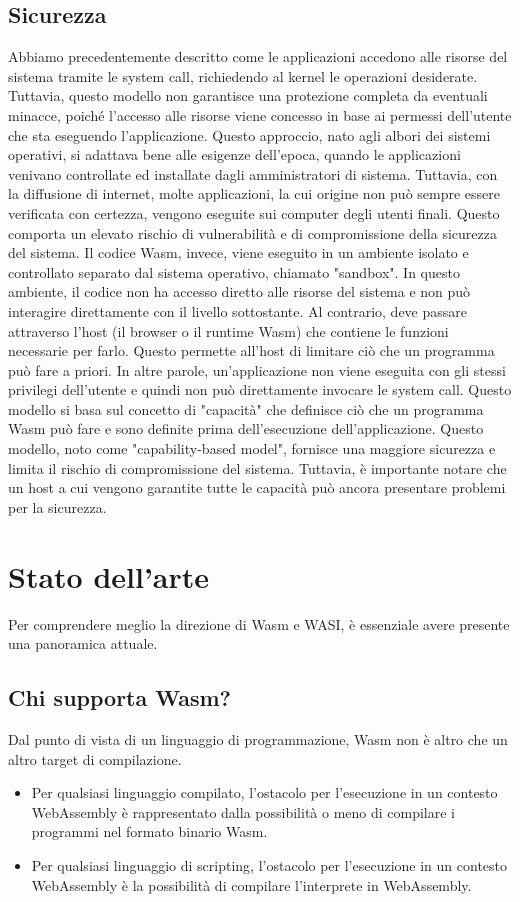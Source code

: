\subsection{Sicurezza}
Abbiamo precedentemente descritto come le applicazioni accedono alle risorse del sistema tramite le system call,
richiedendo al kernel le operazioni desiderate. Tuttavia, questo modello non garantisce una protezione completa da
eventuali minacce, poiché l'accesso alle risorse viene concesso in base ai permessi dell'utente che sta eseguendo
l'applicazione. Questo approccio, nato agli albori dei sistemi operativi, si adattava bene alle esigenze dell'epoca,
quando le applicazioni venivano controllate ed installate dagli amministratori di sistema. Tuttavia, con la diffusione
di internet, molte applicazioni, la cui origine non può sempre essere verificata con certezza, vengono eseguite sui
computer degli utenti finali. Questo comporta un elevato rischio di vulnerabilità e di compromissione della sicurezza
del sistema. Il codice Wasm, invece, viene eseguito in un ambiente isolato e controllato separato dal sistema operativo,
chiamato "sandbox". In questo ambiente, il codice non ha accesso diretto alle risorse del sistema e non può interagire
direttamente con il livello sottostante. Al contrario, deve passare attraverso l'host (il browser o il runtime Wasm) che
contiene le funzioni necessarie per farlo. Questo permette all'host di limitare ciò che un programma può fare a priori.
In altre parole, un'applicazione non viene eseguita con gli stessi privilegi dell’utente e quindi non può direttamente
invocare le system call. Questo modello si basa sul concetto di "capacità" che definisce ciò che un programma Wasm può
fare e sono definite prima dell'esecuzione dell'applicazione. Questo modello, noto come "capability-based model",
fornisce una maggiore sicurezza e limita il rischio di compromissione del sistema. Tuttavia, è importante notare che un
host a cui vengono garantite tutte le capacità può ancora presentare problemi per la sicurezza.

\section{Stato dell'arte}
Per comprendere meglio la direzione di Wasm e WASI, è essenziale avere presente una panoramica attuale.

\subsection{Chi supporta Wasm?}
Dal punto di vista di un linguaggio di programmazione, Wasm non è altro che un altro target di compilazione.
\begin{itemize}
    \item Per qualsiasi linguaggio compilato, l'ostacolo per l'esecuzione in un contesto WebAssembly è rappresentato
    dalla possibilità o meno di compilare i programmi nel formato binario Wasm.
    \item Per qualsiasi linguaggio di scripting, l'ostacolo per l'esecuzione in un contesto WebAssembly è la possibilità
    di compilare l'interprete in WebAssembly.
\end{itemize}

